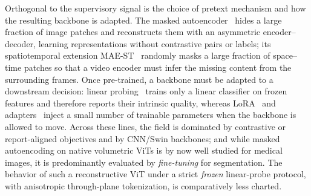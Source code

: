 \documentclass[runningheads]{llncs}
\begin{document}
Orthogonal to the supervisory signal is the choice of pretext mechanism and how
the resulting backbone is adapted. The masked autoencoder~\cite{mae} hides a
large fraction of image patches and reconstructs them with an asymmetric
encoder--decoder, learning representations without contrastive pairs or labels;
its spatiotemporal extension MAE-ST~\cite{maest} randomly masks a large fraction
of space--time patches so that a video encoder must infer the missing content
from the surrounding frames.
Once pre-trained, a backbone must be adapted to a downstream decision: linear
probing~\cite{linearprobing} trains only a linear classifier on frozen features
and therefore reports their intrinsic quality, whereas LoRA~\cite{lora} and
adapters~\cite{adapter} inject a small number of trainable parameters when the
backbone is allowed to move. Across these lines, the field is dominated by
contrastive or report-aligned objectives and by CNN/Swin backbones; and while
masked autoencoding on native volumetric ViTs is by now well studied for medical
images, it is predominantly evaluated by \emph{fine-tuning} for segmentation. The
behavior of such a reconstructive ViT under a strict \emph{frozen} linear-probe
protocol, with anisotropic through-plane tokenization, is comparatively less
charted.
\end{document}
